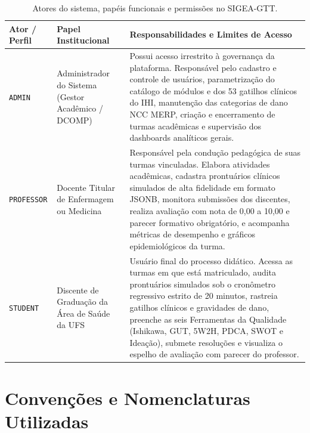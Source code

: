 \begin{table}[htb]
\centering
\small
\caption{Atores do sistema, papéis funcionais e permissões no SIGEA-GTT.}
\label{tab_atores_sistema}
\begin{tabularx}{\textwidth}{l p{3.2cm} X}
\toprule
\textbf{Ator / Perfil} & \textbf{Papel Institucional} & \textbf{Responsabilidades e Limites de Acesso} \\
\midrule
\texttt{ADMIN} & Administrador do Sistema (Gestor Acadêmico / DCOMP) & 
Possui acesso irrestrito à governança da plataforma. Responsável pelo cadastro e controle de usuários, parametrização do catálogo de módulos e dos 53 gatilhos clínicos do IHI, manutenção das categorias de dano NCC MERP, criação e encerramento de turmas acadêmicas e supervisão dos dashboards analíticos gerais. \\
\midrule
\texttt{PROFESSOR} & Docente Titular de Enfermagem ou Medicina & 
Responsável pela condução pedagógica de suas turmas vinculadas. Elabora atividades acadêmicas, cadastra prontuários clínicos simulados de alta fidelidade em formato JSONB, monitora submissões dos discentes, realiza avaliação com nota de 0,00 a 10,00 e parecer formativo obrigatório, e acompanha métricas de desempenho e gráficos epidemiológicos da turma. \\
\midrule
\texttt{STUDENT} & Discente de Graduação da Área de Saúde da UFS & 
Usuário final do processo didático. Acessa as turmas em que está matriculado, audita prontuários simulados sob o cronômetro regressivo estrito de 20 minutos, rastreia gatilhos clínicos e gravidades de dano, preenche as seis Ferramentas da Qualidade (Ishikawa, GUT, 5W2H, PDCA, SWOT e Ideação), submete resoluções e visualiza o espelho de avaliação com parecer do professor. \\
\bottomrule
\end{tabularx}
\end{table}

\section{Convenções e Nomenclaturas Utilizadas}
\label{sec_convencoes}

